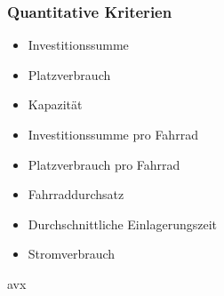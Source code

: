 \subsubsection{Quantitative Kriterien}

\begin{itemize}
  \item Investitionssumme
  \item Platzverbrauch
  \item Kapazität
  \item Investitionssumme pro Fahrrad
  \item Platzverbrauch pro Fahrrad
  \item Fahrraddurchsatz
  \item Durchschnittliche Einlagerungszeit
  \item Stromverbrauch
\end{itemize}

\begin{tiny}
  avx
\end{tiny}

